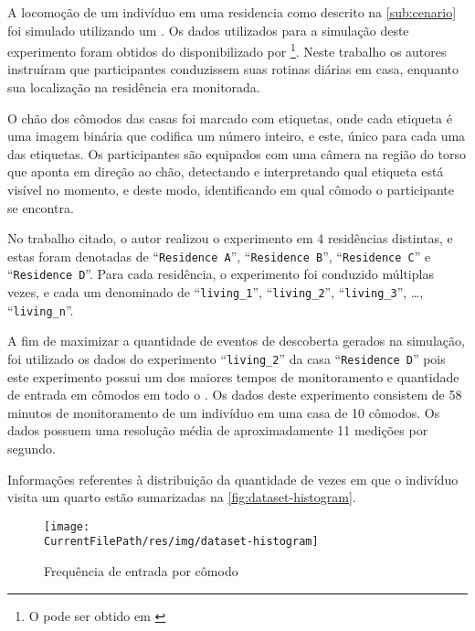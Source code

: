A locomoção de um indivíduo em uma residencia como descrito na \autoref{sub:cenario} foi simulado utilizando um \dataset.
Os dados utilizados para a simulação deste experimento foram obtidos do \dataset disponibilizado por \footnote{O \dataset pode ser obtido em \cite{byrne:kozlowski:dataset:2019}}.
Neste trabalho os autores instruíram que participantes conduzissem suas rotinas diárias em casa, enquanto sua localização na residência era monitorada.

O chão dos cômodos das casas foi marcado com etiquetas, onde cada etiqueta é uma imagem binária que codifica um número inteiro, e este, único para cada uma das etiquetas. Os participantes são equipados com uma câmera na região do torso que aponta em direção ao chão, detectando e interpretando qual etiqueta está visível no momento, e deste modo, identificando em qual cômodo o participante se encontra.

No trabalho citado, o autor realizou o experimento em 4 residências distintas, e estas foram denotadas de ``\texttt{Residence A}'', ``\texttt{Residence B}'', ``\texttt{Residence C}'' e ``\texttt{Residence D}''. Para cada residência, o experimento foi conduzido múltiplas vezes, e cada um denominado de ``\texttt{living\_1}'', ``\texttt{living\_2}'', ``\texttt{living\_3}'', \dots{}, ``\texttt{living\_n}''.


A fim de maximizar a quantidade de eventos de descoberta gerados na simulação, foi utilizado os dados do experimento ``\texttt{living\_2}'' da casa ``\texttt{Residence D}'' pois este experimento possui um dos maiores tempos de monitoramento e quantidade de entrada em cômodos em todo o \dataset. Os dados deste experimento consistem de 58 minutos de monitoramento de um indivíduo em uma casa de 10 cômodos. Os dados possuem uma resolução média de aproximadamente 11 medições por segundo.

Informações referentes à distribuição da quantidade de vezes em que o indivíduo visita um quarto estão sumarizadas na \autoref{fig:dataset-histogram}.

\begin{figure}[htb]
	
	\begin{center}
		
		\caption{\label{fig:dataset-histogram}Frequência de entrada por cômodo}
		\texttt{[image: \\CurrentFilePath/res/img/dataset-histogram]}
		\fonte{\autoriapropria}
		
	\end{center}

\end{figure}

